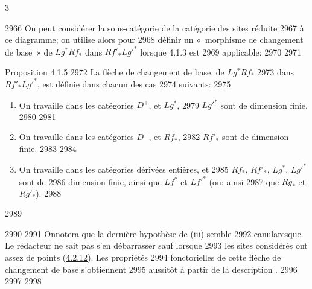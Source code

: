 3	\documentclass[10pt]{../fichiers-configuration-latex/smfart}
\begin{document}
  2966	On peut considérer la sous-catégorie de la catégorie des sites réduite
  2967	à ce diagramme; on utilise alors  pour
  2968	définir un « morphisme de changement de base » de $Lg^{\ast}Rf_{\ast}$ dans $Rf'_{\ast}L{g'}^{\ast}$ lorsque \hyperref[XVII.sch4.1.3]{4.1.3} est
  2969	applicable:
  2970	
  2971	\begin{enonce*}{Proposition 4.1.5}
  2972	La flèche  de changement de base, de $Lg^{\ast}Rf_{\ast}$
  2973	dans $Rf'_{\ast}L{g'}^{\ast}$, est définie dans chacun des cas
  2974	suivants:
  2975	\begin{enumerate}
  2976	\renewcommand{\theenumi}{\roman{enumi}}
  2977	\renewcommand{\labelenumi}{(\theenumi)}
  2978	\item On travaille dans les catégories $D^{+}$, et $Lg^{\ast}$,
  2979	$L{g'}^{\ast}$ sont de dimension finie.
  2980	
  2981	\item On travaille dans les catégories $D^{-}$, et $Rf_{\ast}$,
  2982	$Rf'_{\ast}$ sont de dimension finie.
  2983	
  2984	\item On travaille dans les catégories dérivées entières, et
  2985	$Rf_{\ast}$, $Rf'_{\ast}$, $Lg^{\ast}$, $L{g'}^{\ast}$ sont de
  2986	dimension finie, ainsi que $Lf^{\ast}$ et $L{f'}^{\ast}$ (ou: ainsi
  2987	que $Rg_{\ast}$ et $Rg'_{\ast}$).
  2988	\end{enumerate}
  2989	\end{enonce*}
  2990	
  2991	On\pageoriginale notera que la dernière hypothèse de (iii) semble
  2992	canularesque. Le rédacteur ne sait pas s'en débarrasser sauf lorsque
  2993	les sites considérés ont assez de points (\hyperref[XVII.subsubsec4.2.12]{4.2.12}). Les propriétés
  2994	fonctorielles de cette flèche de changement de base s'obtiennent
  2995	aussitôt à partir de la description .
  2996	
  2997	\setcounter{subsubsection}{5}
  2998	\subsubsection{}
\end{document}
